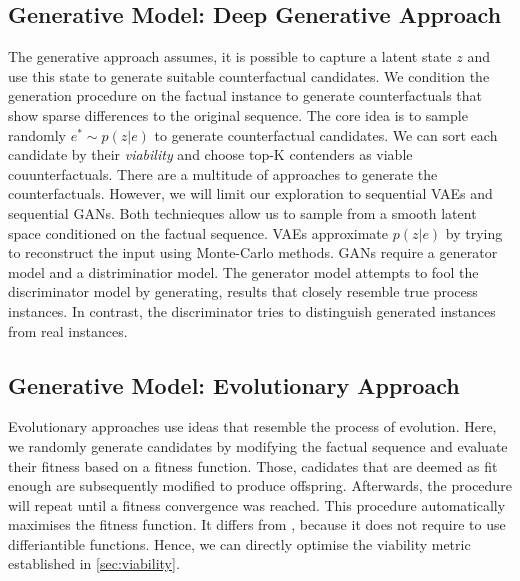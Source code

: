 \documentclass[./../../paper.tex]{subfiles}
\begin{document}
\subsection{Generative Model: Deep Generative Approach}
The generative approach assumes, it is possible to capture a latent state $z$ and use this state to generate suitable counterfactual candidates. We condition the generation procedure on the factual instance to generate counterfactuals that show sparse differences to the original sequence. The core idea is to sample randomly $e^* \sim p(z|e)$ to generate counterfactual candidates. We can sort each candidate by their \emph{viability} and choose top-K contenders as viable couunterfactuals. There are a multitude of approaches to generate the counterfactuals. However, we will limit our exploration to sequential \glspl{VAE} and sequential \glspl{GAN}. Both technieques allow us to sample from a smooth latent space conditioned on the factual sequence. \glspl{VAE} approximate $p(z|e)$ by trying to reconstruct the input using Monte-Carlo methods. \glspl{GAN} require a generator model and a distriminatior model. The generator model attempts to fool the discriminator model by generating, results that closely resemble true process instances. In contrast, the discriminator tries to distinguish generated instances from real instances. 


\subsection{Generative Model: Evolutionary Approach}
Evolutionary approaches use ideas that resemble the process of evolution\needscite{}. Here, we randomly generate candidates by modifying the factual sequence and evaluate their fitness based on a fitness function. Those, cadidates that are deemed as fit enough are subsequently modified to produce offspring. Afterwards, the procedure will repeat until a fitness convergence was reached. This procedure automatically maximises the fitness function. It differs from , because it does not require to use differiantible functions. 
Hence, we can directly optimise the viability metric established in \autoref{sec:viability}.
\end{document}
